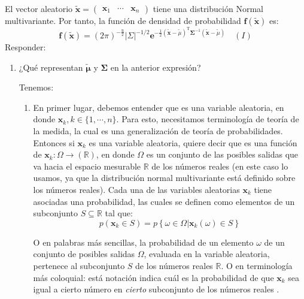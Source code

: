 





\begin{problema}
    El vector aleatorio $\tilde{\boldsymbol{x}}=\left(\begin{array}{lll}\boldsymbol{x}_1 & \cdots & \boldsymbol{x}_n\end{array}\right)$ tiene una distribución Normal multivariante. Por tanto, la función de densidad de probabilidad $\boldsymbol{f}(\widetilde{\boldsymbol{x}})$ es:
$$
\mathbf{f}(\tilde{\boldsymbol{x}})=(2 \pi)^{-\frac{\mathrm{n}}{2}}|\Sigma|^{-1/2} \mathbf{e}^{-\frac{1}{2}(\tilde{\boldsymbol{x}}-\tilde{\mu})^{\mathrm{T}} \boldsymbol{\Sigma}^{-1}(\tilde{\boldsymbol{x}}-\tilde{\mu})}\quad (I)
$$
Responder: 
\begin{enumerate}
    \item ¿Qué representan $\tilde{\boldsymbol{\mu}}$ y $\boldsymbol{\Sigma}$ en la anterior expresión?
    \begin{sol}
        Tenemos: 
        \begin{enumerate}
            \item En primer lugar, debemos entender que es una variable aleatoria, en donde $\boldsymbol{x}_k, k\in \{1,\cdots, n\}$. Para esto, necesitamos terminología de teoría de la medida, la cual es una generalización de teoría de probabilidades. Entonces si $\boldsymbol{x}_k$ es una variable aleatoria, quiere decir que es una función de $\boldsymbol{x}_k:\Omega \to (\mathbb{R})$, en donde $\Omega$ es un conjunto de las posibles salidas que va hacia el espacio mesurable $\mathbb{R}$ de los números reales (en este caso lo usamos, ya que la distribución normal multivariante está definido sobre los números reales). Cada una de las variables aleatorias $\boldsymbol{x}_k$ tiene asociadas una probabilidad, las cuales se definen como elementos de un subconjunto $S\subseteq \mathbb{R}$ tal que:
            $$p(\boldsymbol{x}_k\in S)= p\left\{\omega \in \Omega |\boldsymbol{x}_k(\omega)\in S \right\}$$

            O en palabras más sencillas, la probabilidad de un elemento $\omega$ de un conjunto de posibles salidas $\Omega$, evaluada en la variable aleatoria, pertenece al subconjunto $S$ de los números reales $\mathbb{R}$. O en terminología más coloquial: está notación indica cuál es la probabilidad de que $\boldsymbol{x}_k$ sea igual a cierto número en \textit{cierto} subconjunto de los números reales .


\end{enumerate}
\end{sol}
\end{enumerate}
\end{problema}
